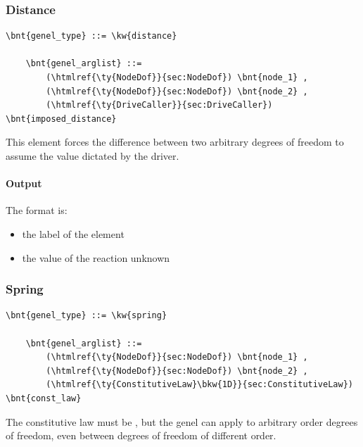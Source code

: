 \subsubsection{Distance}
\label{sec:EL:GENEL:DISTANCE}
\begin{Verbatim}[commandchars=\\\{\}]
    \bnt{genel_type} ::= \kw{distance}

    \bnt{genel_arglist} ::=
        (\htmlref{\ty{NodeDof}}{sec:NodeDof}) \bnt{node_1} ,
        (\htmlref{\ty{NodeDof}}{sec:NodeDof}) \bnt{node_2} ,
        (\htmlref{\ty{DriveCaller}}{sec:DriveCaller}) \bnt{imposed_distance}
\end{Verbatim}
This element forces the difference between two arbitrary degrees of freedom
to assume the value dictated by the driver.

\paragraph{Output}
The format is:
\begin{itemize}
    \item the label of the element
    \item the value of the reaction unknown
\end{itemize}
  
\subsubsection{Spring}
\label{sec:EL:GENEL:SPRING}
\begin{Verbatim}[commandchars=\\\{\}]
    \bnt{genel_type} ::= \kw{spring}

    \bnt{genel_arglist} ::=
        (\htmlref{\ty{NodeDof}}{sec:NodeDof}) \bnt{node_1} ,
        (\htmlref{\ty{NodeDof}}{sec:NodeDof}) \bnt{node_2} ,
        (\htmlref{\ty{ConstitutiveLaw}\bkw{1D}}{sec:ConstitutiveLaw}) \bnt{const_law}
\end{Verbatim}
The constitutive law must be , but the 
genel can apply to arbitrary order degrees of freedom, even between degrees 
of freedom of different order.

